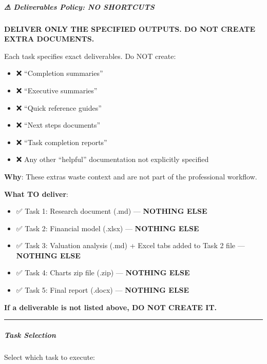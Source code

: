 \documentclass[11pt]{article}
\begin{document}
\subparagraph{⚠ Deliverables Policy: NO SHORTCUTS}\mbox{}\par

\textbf{DELIVER ONLY THE SPECIFIED OUTPUTS. DO NOT CREATE EXTRA DOCUMENTS.}


Each task specifies exact deliverables. Do NOT create:

\begin{itemize}[leftmargin=*,itemsep=2pt,topsep=2pt]
\item {} ❌ ``Completion summaries''
\item {} ❌ ``Executive summaries''
\item {} ❌ ``Quick reference guides''
\item {} ❌ ``Next steps documents''
\item {} ❌ ``Task completion reports''
\item {} ❌ Any other ``helpful'' documentation not explicitly specified
\end{itemize}

\textbf{Why}: These extras waste context and are not part of the professional workflow.


\textbf{What TO deliver}:

\begin{itemize}[leftmargin=*,itemsep=2pt,topsep=2pt]
\item {} ✅ Task 1: Research document (.md) — \textbf{NOTHING ELSE}
\item {} ✅ Task 2: Financial model (.xlsx) — \textbf{NOTHING ELSE}
\item {} ✅ Task 3: Valuation analysis (.md) + Excel tabs added to Task 2 file — \textbf{NOTHING ELSE}
\item {} ✅ Task 4: Charts zip file (.zip) — \textbf{NOTHING ELSE}
\item {} ✅ Task 5: Final report (.docx) — \textbf{NOTHING ELSE}
\end{itemize}

\textbf{If a deliverable is not listed above, DO NOT CREATE IT.}


\vspace{0.5em}\hrule\vspace{0.5em}

\subparagraph{Task Selection}\mbox{}\par

Select which task to execute:
\end{document}
